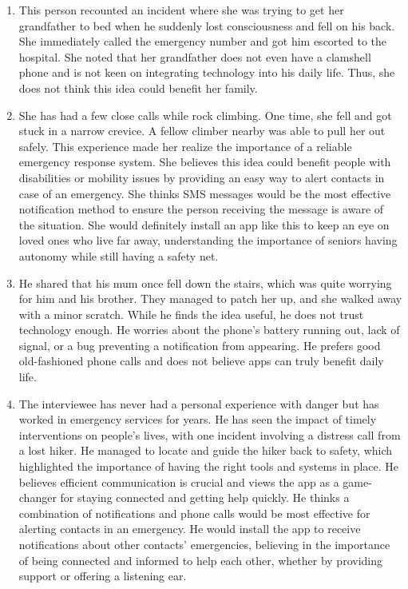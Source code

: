 \documentclass[12pt]{article}
\begin{document}
\begin{enumerate}
    \item This person recounted an incident where she was trying to get her 
    grandfather to bed when he suddenly lost consciousness and fell on his 
    back. She immediately called the emergency number and got him escorted 
    to the hospital. She noted that her grandfather does not even have a 
    clamshell phone and is not keen on integrating technology into his 
    daily life. Thus, she does not think this idea could benefit her 
    family.

    \item She has had a few close calls while rock climbing. One time, she 
    fell and got stuck in a narrow crevice. A fellow climber nearby was able 
    to pull her out safely. This experience made her realize the importance 
    of a reliable emergency response system. She believes this idea could 
    benefit people with disabilities or mobility issues by providing an easy 
    way to alert contacts in case of an emergency. She thinks SMS messages 
    would be the most effective notification method to ensure the person 
    receiving the message is aware of the situation. She would definitely 
    install an app like this to keep an eye on loved ones who live far away, 
    understanding the importance of seniors having autonomy while still 
    having a safety net.

    \item He shared that his mum once fell down the stairs, which was quite 
    worrying for him and his brother. They managed to patch her up, and she 
    walked away with a minor scratch. While he finds the idea useful, he 
    does not trust technology enough. He worries about the phone's battery 
    running out, lack of signal, or a bug preventing a notification from 
    appearing. He prefers good old-fashioned phone calls and does not 
    believe apps can truly benefit daily life.

    \item The interviewee has never had a personal experience with danger 
    but has worked in emergency services for years. He has seen the impact 
    of timely interventions on people's lives, with one incident involving a 
    distress call from a lost hiker. He managed to locate and guide the 
    hiker back to safety, which highlighted the importance of having the 
    right tools and systems in place. He believes efficient communication is 
    crucial and views the app as a game-changer for staying connected and 
    getting help quickly. He thinks a combination of notifications and phone 
    calls would be most effective for alerting contacts in an emergency. 
    He would install the app to receive notifications about other contacts' 
    emergencies, believing in the importance of being connected and informed 
    to help each other, whether by providing support or offering a listening 
    ear.


\end{enumerate}
\end{document}

